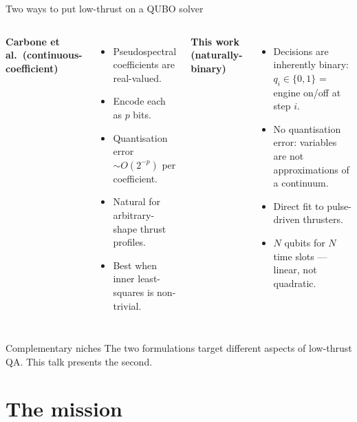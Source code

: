 \documentclass[10pt,aspectratio=169]{beamer}
\begin{document}
\begin{frame}{Two ways to put low-thrust on a QUBO solver}
\begin{columns}[T,onlytextwidth]
\textbf{Carbone et al.\ (continuous-coefficient)}
\begin{itemize}[leftmargin=1em, itemsep=2pt]
  \item Pseudospectral coefficients are real-valued.
  \item Encode each as $p$ bits.
  \item Quantisation error $\sim O(2^{-p})$ per coefficient.
  \item Natural for arbitrary-shape thrust profiles.
  \item Best when inner least-squares is non-trivial.
\end{itemize}

\textbf{This work (naturally-binary)}
\begin{itemize}[leftmargin=1em, itemsep=2pt]
  \item Decisions are inherently binary:
    $q_i \in \{0,1\}$ = engine on/off at step $i$.
  \item No quantisation error: variables are not approximations
    of a continuum.
  \item Direct fit to pulse-driven thrusters.
  \item $N$ qubits for $N$ time slots --- linear, not quadratic.
\end{itemize}
\end{columns}

\vspace{0.5em}
\begin{block}{Complementary niches}
The two formulations target different aspects of low-thrust QA.
This talk presents the second.
\end{block}
\end{frame}

\section{The mission}
\end{document}

